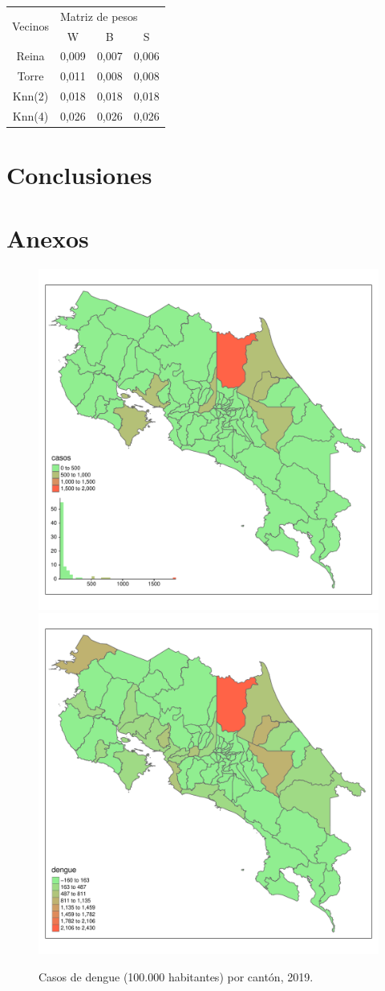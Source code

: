 \documentclass[12pt,a4paper]{article}
\begin{document}
\begin{table}[h]
\centering
\begin{tabular}{cccc}
\hline
\multirow{2}{*}{Vecinos} & \multicolumn{3}{l}{Matriz de pesos}\\ \cline{2-4} 
&W&B&S\\ \hline
Reina&0,009&0,007&0,006\\
Torre&0,011&0,008&0,008\\
Knn(2)&0,018&0,018&0,018\\
Knn(4)&0,026&0,026&0,026\\ \hline
\end{tabular}
\end{table}

\section{Conclusiones}

\section{Anexos}

\begin{figure}[hbtp]
\centering
\includegraphics[width=.48\textwidth]{FA1.pdf}
\includegraphics[width=.48\textwidth]{FA2.pdf}
\caption{Casos de dengue (100.000 habitantes) por cantón, 2019.}
\end{figure}
\end{document}
